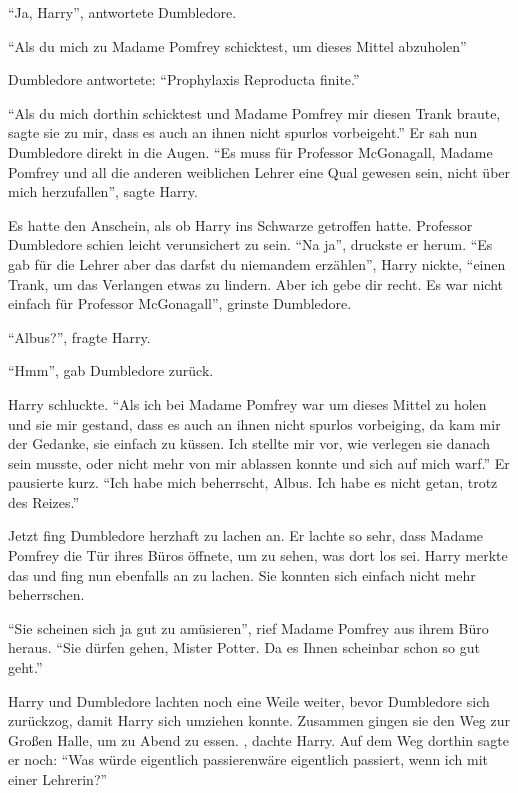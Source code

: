 \enquote{Ja, Harry}, antwortete Dumbledore.

\enquote{Als du mich zu Madame Pomfrey schicktest, um dieses Mittel abzuholen\abs}

Dumbledore antwortete: \enquote{Prophylaxis Reproducta finite.}

\enquote{Als du mich dorthin schicktest und Madame Pomfrey mir diesen Trank braute, sagte sie zu mir, dass es auch an ihnen nicht spurlos vorbeigeht.} Er sah nun Dumbledore direkt in die Augen. \enquote{Es muss für Professor McGonagall, Madame Pomfrey und all die anderen weiblichen Lehrer eine Qual gewesen sein, nicht über mich herzufallen}, sagte Harry.

Es hatte den Anschein, als ob Harry ins Schwarze getroffen hatte. Professor Dumbledore schien leicht verunsichert zu sein. \enquote{Na ja}, druckste er herum. \enquote{Es gab für die Lehrer \gst aber das darfst du niemandem erzählen}, Harry nickte, \enquote{einen Trank, um das Verlangen etwas zu lindern. Aber ich gebe dir recht. Es war nicht einfach für Professor McGonagall}, grinste Dumbledore.

\enquote{Albus?}, fragte Harry.

\enquote{Hmm}, gab Dumbledore zurück.

Harry schluckte. \enquote{Als ich bei Madame Pomfrey war um dieses Mittel zu holen und sie mir gestand, dass es auch an ihnen nicht spurlos vorbeiging, da kam mir der Gedanke, sie einfach zu küssen. Ich stellte mir vor, wie verlegen sie danach sein musste, oder nicht mehr von mir ablassen konnte und sich auf mich warf.} Er pausierte kurz. \enquote{Ich habe mich beherrscht, Albus. Ich habe es nicht getan, trotz des Reizes.}

Jetzt fing Dumbledore herzhaft zu lachen an. Er lachte so sehr, dass Madame Pomfrey die Tür ihres Büros öffnete, um zu sehen, was dort los sei. Harry merkte das und fing nun ebenfalls an zu lachen. Sie konnten sich einfach nicht mehr beherrschen.

\enquote{Sie scheinen sich ja gut zu amüsieren}, rief Madame Pomfrey aus ihrem Büro heraus. \enquote{Sie dürfen gehen, Mister Potter. Da es Ihnen scheinbar schon so gut geht.}

Harry und Dumbledore lachten noch eine Weile weiter, bevor Dumbledore sich zurückzog, damit Harry sich umziehen konnte. Zusammen gingen sie den Weg zur Großen Halle, um zu Abend zu essen. , dachte Harry.  Auf dem Weg dorthin sagte er noch: \enquote{Was würde eigentlich passieren\abs wäre eigentlich passiert, wenn ich mit einer Lehrerin?}

